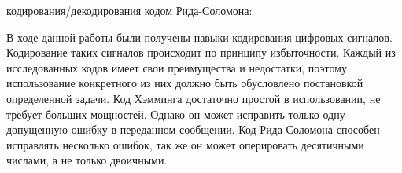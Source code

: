 \documentclass[a4paper,12pt]{article}
\begin{document}
\begin{enumerate}
{ кодирования/декодирования кодом Рида-Соломона:
\\}

{\bfseries{}}

В ходе данной работы были получены навыки кодирования цифровых сигналов. Кодирование таких сигналов происходит по принципу избыточности. Каждый из исследованных кодов имеет свои преимущества и недостатки, поэтому использование конкретного из них должно быть обусловлено постановкой определенной задачи. Код Хэмминга достаточно простой в использовании, не требует больших мощностей. Однако он может исправить только одну допущенную ошибку в переданном сообщении. Код Рида-Соломона способен исправлять несколько ошибок, так же он может оперировать десятичными числами, а не только двоичными.
\end{enumerate}
\end{document}
